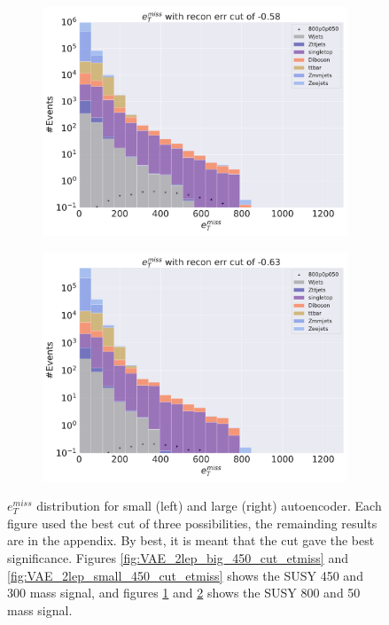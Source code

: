 \begin{figure}[H]
    \hfill
    \begin{subfigure}{.45\textwidth}
        \includegraphics[width=\textwidth]{Figures/VAE_testing/big/2lep/b_data_recon_big_rm3_feats_sig_800p0p050_recon_errcut_-0.58.pdf}
        \caption{}
        \label{fig:VAE_2lep_big_800_cut_etmiss}
    \end{subfigure}
    \hfill   
    \begin{subfigure}{.45\textwidth}
        \includegraphics[width=\textwidth]{Figures/VAE_testing/small/2lep/b_data_recon_big_rm3_feats_sig_800p0p050_recon_errcut_-0.63.pdf}
        \caption{}
        \label{fig:VAE_2lep_small_800_cut_etmiss}
    \end{subfigure}
    \hfill      
    \caption[$e_T^{miss}$ best cuts for regular autoencoder]{$e_T^{miss}$ distribution for small (left) and large (right) autoencoder.
    Each figure used the best cut of three possibilities, the remainding results are in the appendix. By best, it is meant that the cut
    gave the best significance. Figures \ref{fig:VAE_2lep_big_450_cut_etmiss} and \ref{fig:VAE_2lep_small_450_cut_etmiss} shows the SUSY 450 and 300 mass signal, 
    and figures \ref{fig:VAE_2lep_big_800_cut_etmiss} and \ref{fig:VAE_2lep_small_800_cut_etmiss} shows the SUSY 800 and 50 mass signal.}
    \label{fig:VAE_2lep_recon_err_both_sig_cut_etmiss}
\end{figure}


